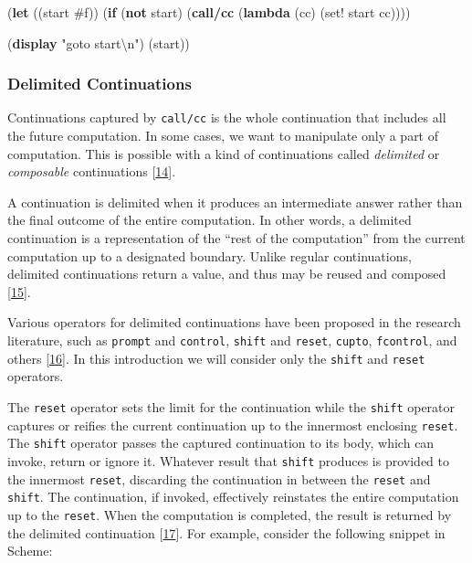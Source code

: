\documentclass[12pt,a4paper,oneside,openright]{book}
\newenvironment{Shaded}{\begin{snugshade}}{\end{snugshade}}
\newcommand{\KeywordTok}[1]{\textcolor[rgb]{0.13,0.29,0.53}{\textbf{{#1}}}}
\newcommand{\DecValTok}[1]{\textcolor[rgb]{0.00,0.00,0.81}{{#1}}}
\newcommand{\StringTok}[1]{\textcolor[rgb]{0.31,0.60,0.02}{{#1}}}
\newcommand{\NormalTok}[1]{{#1}}
\begin{document}
\begin{Shaded}
\begin{Highlighting}[]
    \NormalTok{(}\KeywordTok{let} \NormalTok{((start }\DecValTok{#f}\NormalTok{))}
      \NormalTok{(}\KeywordTok{if} \NormalTok{(}\KeywordTok{not} \NormalTok{start)}
        \NormalTok{(}\KeywordTok{call/cc} \NormalTok{(}\KeywordTok{lambda} \NormalTok{(cc)}
                   \NormalTok{(set! start cc))))}

      \NormalTok{(}\KeywordTok{display} \StringTok{"goto start\textbackslash{}n"}\NormalTok{)}
      \NormalTok{(start))}
\end{Highlighting}
\end{Shaded}

\subsubsection{Delimited Continuations}\label{delimited-continuations}

Continuations captured by \texttt{call/cc} is the whole continuation
that includes all the future computation. In some cases, we want to
manipulate only a part of computation. This is possible with a kind of
continuations called \emph{delimited} or \emph{composable} continuations
{[}\hyperref[ref-Asai2011]{14}{]}.

A continuation is delimited when it produces an intermediate answer
rather than the final outcome of the entire computation. In other words,
a delimited continuation is a representation of the ``rest of the
computation'' from the current computation up to a designated boundary.
Unlike regular continuations, delimited continuations return a value,
and thus may be reused and composed
{[}\hyperref[ref-kiselyov2007delimited]{15}{]}.

Various operators for delimited continuations have been proposed in the
research literature, such as \texttt{prompt} and \texttt{control},
\texttt{shift} and \texttt{reset}, \texttt{cupto}, \texttt{fcontrol},
and others {[}\hyperref[ref-RacketContinuations2015]{16}{]}. In this
introduction we will consider only the \texttt{shift} and \texttt{reset}
operators.

The \texttt{reset} operator sets the limit for the continuation while
the \texttt{shift} operator captures or reifies the current continuation
up to the innermost enclosing \texttt{reset}. The \texttt{shift}
operator passes the captured continuation to its body, which can invoke,
return or ignore it. Whatever result that \texttt{shift} produces is
provided to the innermost \texttt{reset}, discarding the continuation in
between the \texttt{reset} and \texttt{shift}. The continuation, if
invoked, effectively reinstates the entire computation up to the
\texttt{reset}. When the computation is completed, the result is
returned by the delimited continuation
{[}\hyperref[ref-DelimitedWiki2015]{17}{]}. For example, consider the
following snippet in Scheme:
\end{document}
